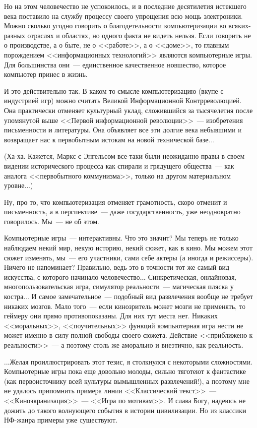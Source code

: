 \documentclass{scrbook}
\newcommand{\flqq}{<<}
\newcommand{\frqq}{>>}
\newcommand{\mdash}{~--- }
\begin{document}
Но на этом человечество не успокоилось, и в последние десятилетия истекшего века поставило на службу процессу своего упрощения всю мощь электроники. Можно сколько угодно говорить о благодетельности компьютеризации во всяких-разных отраслях и областях, но одного факта не видеть нельзя. Если говорить не о производстве, а о быте, не о {\flqq}работе{\frqq}, а о {\flqq}доме{\frqq}, то главным порождением {\flqq}информационных технологий{\frqq} являются компьютерные игры. Для большинства они{\mdash}единственное качественное новшество, которое компьютер принес в жизнь.

И это действительно так. В каком-то смысле компьютеризацию (вкупе с индустрией игр) можно считать Великой Информационной Контрреволюцией. Она практически отменяет культурный уклад, сложившийся за тысячелетия после упомянутой выше {\flqq}Первой информационной революции{\frqq}{\mdash}изобретения письменности и литературы. Она объявляет все эти долгие века небывшими и возвращает нас к первобытным истокам на новой технической базе...

(Ха-ха. Кажется, Маркс с Энгельсом все-таки были неожиданно правы в своем видении исторического процесса как спирали и грядущего общества{\mdash}как аналога {\flqq}первобытного коммунизма{\frqq}, только на другом материальном уровне...)

Ну, про то, что компьютеризация отменяет грамотность, скоро отменит и письменность, а в перспективе{\mdash}даже государственность, уже неоднократно говорилось. Мы{\mdash}не об этом.

Компьютерные игры{\mdash}интерактивны. Что это значит? Мы теперь не только наблюдаем некий мир, некую историю, некий сюжет, как в кино. Мы можем этот сюжет изменять, мы{\mdash}его участники, сами себе актеры (а иногда и режиссеры). Ничего не напоминает? Правильно, ведь это в точности тот же самый вид искусства, с которого начинало человечество... Синкретическая, онлайновая, многопользовательская игра, симулятор реальности{\mdash}магическая пляска у костра... И самое замечательное{\mdash}подобный вид развлечения вообще не требует никаких мозгов. Мало того{\mdash}если кинозритель может мозги не применять, то геймеру они прямо противопоказаны. Для них тут места нет. Никаких {\flqq}моральных{\frqq}, {\flqq}поучительных{\frqq} функций компьютерная игра нести не может именно в силу полной свободы своего сюжета. Действие {\flqq}приближено к реальности{\frqq}{\mdash}а поэтому столь же аморально и внеэтично, как реальность.

...Желая проиллюстрировать этот тезис, я столкнулся с некоторыми сложностями. Компьютерные игры пока еще довольно молоды, сильно тяготеют к фантастике (как первоисточнику всей культуры вымышленных развлечений!), а поэтому мне не удалось припомнить примера линии {\flqq}Классический текст{\frqq}{\mdash}{\flqq}Киноэкранизация{\frqq}{\mdash}{\flqq}Игра по мотивам{\frqq}. И слава Богу, надеюсь не дожить до такого волнующего события в истории цивилизации. Но из классики НФ-жанра примеры уже существуют.
\end{document}
